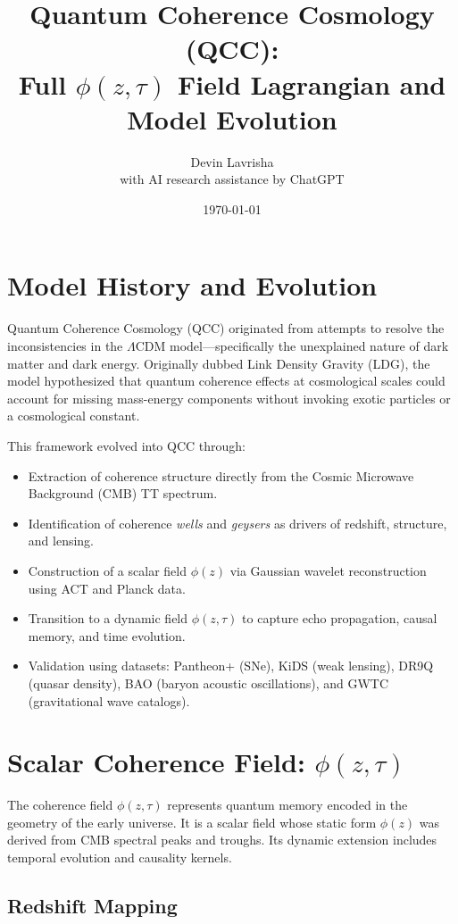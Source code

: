 \documentclass[11pt]{article}
\title{Quantum Coherence Cosmology (QCC):\\
Full $\phi(z, \tau)$ Field Lagrangian and Model Evolution}
\author{Devin Lavrisha \\ \small{with AI research assistance by ChatGPT}}
\date{\today}
\begin{document}
\maketitle

\section{Model History and Evolution}

Quantum Coherence Cosmology (QCC) originated from attempts to resolve the inconsistencies in the $\Lambda$CDM model—specifically the unexplained nature of dark matter and dark energy. Originally dubbed Link Density Gravity (LDG), the model hypothesized that quantum coherence effects at cosmological scales could account for missing mass-energy components without invoking exotic particles or a cosmological constant.

This framework evolved into QCC through:
\begin{itemize}
    \item Extraction of coherence structure directly from the Cosmic Microwave Background (CMB) TT spectrum.
    \item Identification of coherence \textit{wells} and \textit{geysers} as drivers of redshift, structure, and lensing.
    \item Construction of a scalar field $\phi(z)$ via Gaussian wavelet reconstruction using ACT and Planck data.
    \item Transition to a dynamic field $\phi(z, \tau)$ to capture echo propagation, causal memory, and time evolution.
    \item Validation using datasets: Pantheon+ (SNe), KiDS (weak lensing), DR9Q (quasar density), BAO (baryon acoustic oscillations), and GWTC (gravitational wave catalogs).
\end{itemize}

\section{Scalar Coherence Field: $\phi(z, \tau)$}

The coherence field $\phi(z, \tau)$ represents quantum memory encoded in the geometry of the early universe. It is a scalar field whose static form $\phi(z)$ was derived from CMB spectral peaks and troughs. Its dynamic extension includes temporal evolution and causality kernels.

\subsection{Redshift Mapping}
\end{document}
